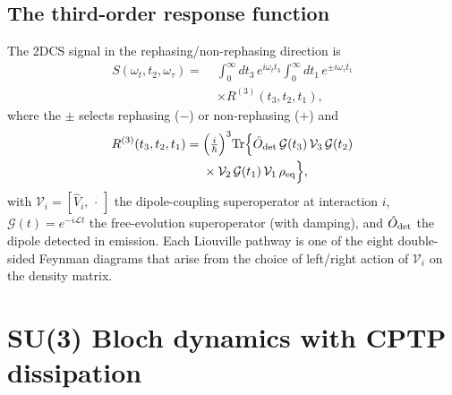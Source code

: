 \documentclass[reprint,amsmath,amssymb,aps,prb,longbibliography]{revtex4-2}
\begin{document}
\subsection{The third-order response function}

The 2DCS signal in the rephasing/non-rephasing direction is
\begin{equation}
\begin{aligned}
S(\omega_t, t_2, \omega_\tau) =\;& \int_0^\infty\!dt_3\,e^{i\omega_t t_3}\!\int_0^\infty\!dt_1\,e^{\pm i\omega_\tau t_1}\\
&\times R^{(3)}(t_3, t_2, t_1),
\end{aligned}
\label{eq:S2DCS}
\end{equation}
where the $\pm$ selects rephasing ($-$) or non-rephasing ($+$) and
\begin{equation}
\begin{aligned}
R^{(3)}(t_3, t_2, t_1) =\;& \Bigl(\tfrac{i}{\hbar}\Bigr)^3 \mathrm{Tr}\Bigl\{
\hat O_{\rm det}\,\mathcal G(t_3)\,\mathcal V_3\,\mathcal G(t_2)\\
&\times\mathcal V_2\,\mathcal G(t_1)\,\mathcal V_1\,\rho_{\rm eq}
\Bigr\},
\end{aligned}
\label{eq:R3}
\end{equation}
with $\mathcal V_i = [\hat V_i,\,\cdot\,]$ the dipole-coupling
superoperator at interaction $i$, $\mathcal G(t) = e^{-i\mathcal Lt}$ the
free-evolution superoperator (with damping), and $\hat O_{\rm det}$ the
dipole detected in emission. Each Liouville pathway is one of the eight
double-sided Feynman diagrams that arise from the choice of
left/right action of $\mathcal V_i$ on the density matrix.

\section{SU(3) Bloch dynamics with CPTP dissipation}
\label{sec:bloch}
\end{document}
